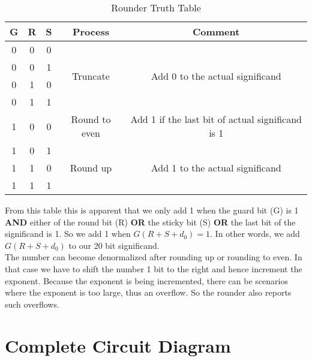 \documentclass[14pt]{article}
\begin{document}
\begin{table}[!h]
	\begin{center}
		\begin{tabular}{|c|c|c|c|c|}
			\hline
			\textbf{G} & \textbf{R} & \textbf{S} & \textbf{Process} & \textbf{Comment}\\
			\hline
			0 & 0 & 0 & \multirow{4}{*}{Truncate} & \multirow{4}{*}{Add 0 to the actual significand}\\
			\cline{1-3}
			0 & 0 & 1 & &\\
			\cline{1-3}
			0 & 1 & 0 & &\\
			\cline{1-3}
			0 & 1 & 1 & &\\
			\hline
			1 & 0 & 0 & Round to even & Add 1 if the last bit of actual significand is 1\\
			\hline
			1 & 0 & 1 & \multirow{3}{*}{Round up} & \multirow{3}{*}{Add 1 to the actual significand}\\
			\cline{1-3}
			1 & 1 & 0 & & \\
			\cline{1-3}
			1 & 1 & 1 & & \\
			\hline
		\end{tabular}
		\caption{Rounder Truth Table}
	\end{center}
\end{table}
From this table this is apparent that we only add 1 when the guard bit (G) is 1 \textbf{AND} either of the round bit (R) \textbf{OR} the sticky bit (S) \textbf{OR} the last bit of the significand is 1. So we add 1 when $G(R + S + d_0) = 1$. In other words, we add $G(R + S + d_0)$ to our 20 bit significand.\\

The number can become denormalized after rounding up or rounding to even. In that case we have to shift the number 1 bit to the right and hence increment the exponent. Because the exponent is being incremented, there can be scenarios where the exponent is too large, thus an overflow. So the rounder also reports such overflows.

\pagebreak
\section{Complete Circuit Diagram}
\pagebreak
\end{document}
